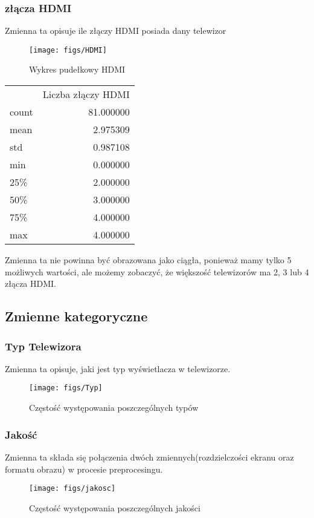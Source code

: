 \documentclass[11pt,a4paper]{article}
\begin{document}
		\subsubsection{złącza HDMI}
			Zmienna ta opisuje ile złączy HDMI posiada dany telewizor
			\begin{figure}[h]
				\centering
				\texttt{[image: figs/HDMI]}
				\caption[HDMI]{Wykres pudełkowy HDMI}
				\label{fig:HDMI}
			\end{figure}
			\begin{center}
				\begin{tabular}{lr}
					 
					{} &  Liczba złączy HDMI \\
					 
					count &           81.000000 \\
					mean  &            2.975309 \\
					std   &            0.987108 \\
					min   &            0.000000 \\
					25\%   &            2.000000 \\
					50\%   &            3.000000 \\
					75\%   &            4.000000 \\
					max   &            4.000000 \\
					 
				\end{tabular}
			\end{center}
			Zmienna ta nie powinna być obrazowana jako ciągła, ponieważ mamy tylko 5 możliwych wartości, ale możemy zobaczyć, że
			większość telewizorów ma 2, 3 lub 4 złącza HDMI.  
	
	\subsection{Zmienne kategoryczne}
		
		\subsubsection{Typ Telewizora}
			Zmienna ta opisuje, jaki jest typ wyświetlacza w telewizorze.
			\begin{figure}[!htbp]
				\centering
				\texttt{[image: figs/Typ]}
				\caption[Typ]{Częstość występowania poszczególnych typów}
				\label{fig:typ}
			\end{figure}
			\FloatBarrier
			\newpage
		\subsubsection{Jakość}
			Zmienna ta składa się połączenia dwóch zmiennych(rozdzielczości ekranu oraz formatu obrazu)
			 w procesie preprocesingu.
			\begin{figure}[!htbp]
				\centering
				\texttt{[image: figs/jakosc]}
				\caption[Jakość]{Częstość występowania poszczególnych jakości}
				\label{fig:jakosc}
			\end{figure}
			\FloatBarrier	
			\newpage
\end{document}
